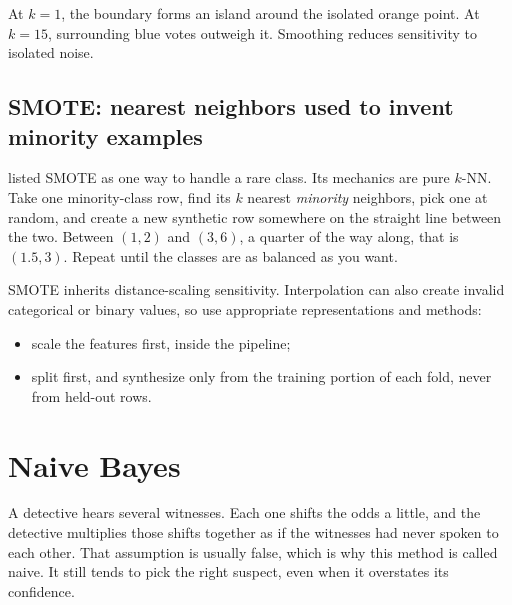 \begin{intuition}
At $k=1$, the boundary forms an island around the isolated orange point. At $k=15$, surrounding blue votes outweigh it. Smoothing reduces sensitivity to isolated noise.
\end{intuition}

\subsection{SMOTE: nearest neighbors used to invent minority examples}
\label{sec:smote}

 listed SMOTE as one way to handle a rare class. Its mechanics are pure $k$-NN. Take one minority-class row, find its $k$ nearest \emph{minority} neighbors, pick one at random, and create a new synthetic row somewhere on the straight line between the two. Between $(1,2)$ and $(3,6)$, a quarter of the way along, that is $(1.5,3)$. Repeat until the classes are as balanced as you want.

SMOTE inherits distance-scaling sensitivity. Interpolation can also create invalid categorical or binary values, so use appropriate representations and methods:

\begin{itemize}
  \item scale the features first, inside the pipeline;
  \item split first, and synthesize only from the training portion of each fold, never from held-out rows.
\end{itemize}


\section{Naive Bayes}
\label{sec:naive-bayes}

\begin{analogy}
A detective hears several witnesses. Each one shifts the odds a little, and the detective multiplies those shifts together as if the witnesses had never spoken to each other. That assumption is usually false, which is why this method is called naive. It still tends to pick the right suspect, even when it overstates its confidence.
\end{analogy}

